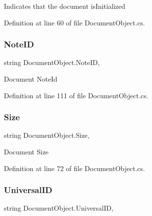Indicates that the document is\+Initialized 



Definition at line 60 of file Document\+Object.\+cs.

\mbox{\label{class_document_object_ac447461e3dc7f8258695f902ef0758a7}} 
\subsubsection{\texorpdfstring{Note\+ID}{NoteID}}
{\footnotesize\ttfamily string Document\+Object.\+Note\+ID\hspace{0.3cm}{\ttfamily [get]}, {\ttfamily [set]}}



Document Note\+Id 



Definition at line 111 of file Document\+Object.\+cs.

\mbox{\label{class_document_object_abdc1a6dfc1bb2261b523cf94468448b9}} 
\subsubsection{\texorpdfstring{Size}{Size}}
{\footnotesize\ttfamily string Document\+Object.\+Size\hspace{0.3cm}{\ttfamily [get]}, {\ttfamily [set]}}



Document Size 



Definition at line 72 of file Document\+Object.\+cs.

\mbox{\label{class_document_object_a8b96d04632a2802e7cc5466ca5cee8cf}} 
\subsubsection{\texorpdfstring{Universal\+ID}{UniversalID}}
{\footnotesize\ttfamily string Document\+Object.\+Universal\+ID\hspace{0.3cm}{\ttfamily [get]}, {\ttfamily [set]}}



